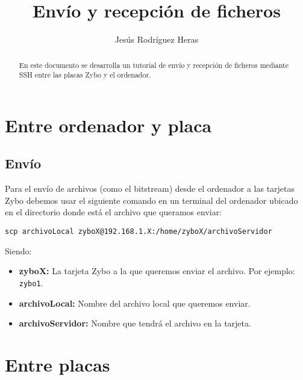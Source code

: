 \documentclass[12pt,letterpaper]{article}
\title{Envío y recepción de ficheros}
\author{Jesús Rodríguez Heras}
\begin{document}
	
	\maketitle
	\begin{abstract} %
		\begin{center}
			En este documento se desarrolla un tutorial de envío y recepción de ficheros mediante SSH entre las placas Zybo y el ordenador.
		\end{center}
	\end{abstract}
	\thispagestyle{empty}
	\newpage
	
	\tableofcontents
	\newpage
	
	
	
	
	\lstset{language=bash, numbers=left, numberstyle=\tiny, numbersep=10pt, firstnumber=1, stepnumber=1, basicstyle=\small\ttfamily, tabsize=1, extendedchars=true, inputencoding=latin1}
	
\section{Entre ordenador y placa}
\subsection{Envío}
Para el envío de archivos (como el bitstream) desde el ordenador a las tarjetas Zybo debemos usar el siguiente comando en un terminal del ordenador ubicado en el directorio donde está el archivo que queramos enviar:
\begin{center}
	\texttt{scp archivoLocal zyboX@192.168.1.X:/home/zyboX/archivoServidor}
\end{center}
Siendo:
\begin{itemize}
	\item \textbf{zyboX:} La tarjeta Zybo a la que queremos enviar el archivo. Por ejemplo: \texttt{zybo1}.
	\item \textbf{archivoLocal:} Nombre del archivo local que queremos enviar.
	\item \textbf{archivoServidor:} Nombre que tendrá el archivo en la tarjeta.
\end{itemize}

\section{Entre placas}
\end{document}
